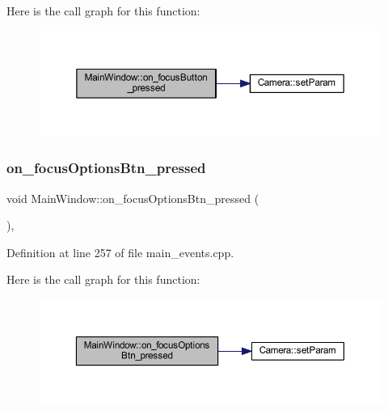Here is the call graph for this function\+:
\nopagebreak
\begin{figure}[H]
\begin{center}
\leavevmode
\includegraphics[width=350pt]{classMainWindow_a5e9d6c6b9249ee3478427d2e33dfb901_cgraph}
\end{center}
\end{figure}
\mbox{\label{classMainWindow_ac3ebf4a093bf8190311ec0c146ea3bbc}} 
\subsubsection{\texorpdfstring{on\_focusOptionsBtn\_pressed}{on\_focusOptionsBtn\_pressed}}
{\footnotesize\ttfamily void Main\+Window\+::on\+\_\+focus\+Options\+Btn\+\_\+pressed (\begin{DoxyParamCaption}{ }\end{DoxyParamCaption})\hspace{0.3cm}{\ttfamily [private]}, {\ttfamily [slot]}}



Definition at line 257 of file main\+\_\+events.\+cpp.

Here is the call graph for this function\+:
\nopagebreak
\begin{figure}[H]
\begin{center}
\leavevmode
\includegraphics[width=350pt]{classMainWindow_ac3ebf4a093bf8190311ec0c146ea3bbc_cgraph}
\end{center}
\end{figure}
\mbox{\label{classMainWindow_a4984f1218d13c28b7dd40f9e1cc9b9be}} 
